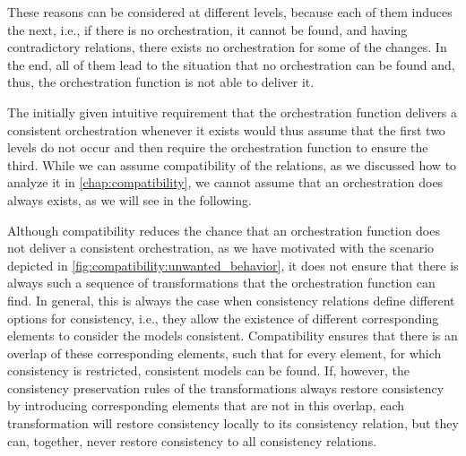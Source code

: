 These reasons can be considered at different levels, because each of them induces the next, i.e., if there is no orchestration, it cannot be found, and having contradictory relations, there exists no orchestration for some of the changes.
In the end, all of them lead to the situation that no orchestration can be found and, thus, the orchestration function is not able to deliver it.

The initially given intuitive requirement that the orchestration function delivers a consistent orchestration whenever it exists would thus assume that the first two levels do not occur and then require the orchestration function to ensure the third.
While we can assume compatibility of the relations, as we discussed how to analyze it in \autoref{chap:compatibility}, we cannot assume that an orchestration does always exists, as we will see in the following.

Although compatibility reduces the chance that an orchestration function does not deliver a consistent orchestration, as we have motivated with the scenario depicted in \autoref{fig:compatibility:unwanted_behavior}, it does not ensure that there is always such a sequence of transformations that the orchestration function can find.
In general, this is always the case when consistency relations define different options for consistency, i.e., they allow the existence of different corresponding elements to consider the models consistent.
Compatibility ensures that there is an overlap of these corresponding elements, such that for every element, for which consistency is restricted, consistent models can be found.
If, however, the consistency preservation rules of the transformations always restore consistency by introducing corresponding elements that are not in this overlap, each transformation will restore consistency locally to its consistency relation, but they can, together, never restore consistency to all consistency relations.

